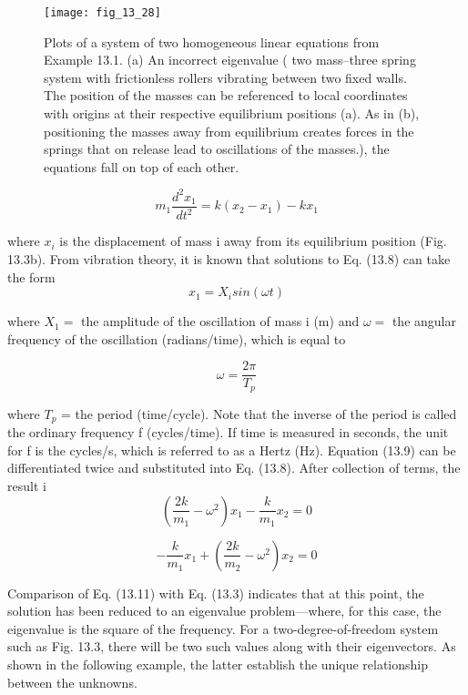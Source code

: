 \documentclass[../main.tex]{subfiles}
\begin{document}
\begin{figure}[H]
		\centering
		\texttt{[image: fig\_13\_28]}
	   \caption{\textsf{Plots of a system of two homogeneous linear equations from Example 13.1. (a) An incorrect
eigenvalue ( two mass–three spring system with frictionless rollers vibrating between two fixed walls.
The position of the masses can be referenced to local coordinates with origins at their respective
equilibrium positions (a). As in (b), positioning the masses away from equilibrium creates forces
in the springs that on release lead to oscillations of the masses.), the equations fall on top of each other.}}
	   \label{fig:fig_13_28}
\end{figure}


\begin{equation}
m_{1}\frac{d^{2}x_{1}}{dt^{2}}=k(x_{2}-x_{1})-kx_{1}\tag{13.8b}
\end{equation}


	where $x_{i}$ is the displacement of mass i away from its equilibrium position (Fig. 13.3b).
From vibration theory, it is known that solutions to Eq. (13.8) can take the form
\begin{equation}
x_{1}=X_{i}sin(\omega t)\tag{13.9}
\end{equation}

where $X_{1} =$ the amplitude of the oscillation of mass i (m) and $\omega =$ the angular frequency
of the oscillation (radians/time), which is equal to

\begin{equation}
\omega =\frac{2\pi }{T_{p}}\tag{13.10}
\end{equation}


where $T_{p}$ = the period (time/cycle). Note that the inverse of the period is called the ordinary frequency f (cycles/time). If time is measured in seconds, the unit for f is the cycles/s,
which is referred to as a Hertz (Hz).
Equation (13.9) can be differentiated twice and substituted into Eq. (13.8). After collection of terms, the result i
\begin{equation}
\left ( \frac{2k}{m_{1}}-\omega ^{2}\right )x_{1}-\frac{k}{m_{1}}x_{2}=0\tag{13.11a}
\end{equation}


\begin{equation}
-\frac{k}{m_{1}}x_{1}+\left ( \frac{2k}{m_{2}}-\omega ^{2} \right )x_{2}=0 \tag{13.11b}
\end{equation}


Comparison of Eq. (13.11) with Eq. (13.3) indicates that at this point, the solution has
been reduced to an eigenvalue problem—where, for this case, the eigenvalue is the square
of the frequency. For a two-degree-of-freedom system such as Fig. 13.3, there will be two
such values along with their eigenvectors. As shown in the following example, the latter
establish the unique relationship between the unknowns.
\end{document}
